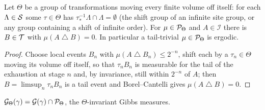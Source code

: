 \begin{proposition}[Georgii (14.9)]
    \label{prop:erg-149}
    \leanok

    Let $\Theta$ be a group of transformations moving every finite volume off itself: for each
    $\Lambda \in \mathcal{S}$ some $\tau \in \Theta$ has $\tau_*^{-1}\Lambda \cap \Lambda = \emptyset$
    (the shift group of an infinite site group, or any group containing a shift of infinite
    order). For $\mu \in \mathcal{P}_\Theta$ and $A \in \mathcal{I}$ there is $B \in \mathcal{T}$ with
    $\mu(A \mathbin{\triangle} B) = 0$. In particular a tail-trivial $\mu \in \mathcal{P}_\Theta$ is
    ergodic.
\end{proposition}
\begin{proof}
    \leanok

    Choose local events $B_n$ with $\mu(A \mathbin{\triangle} B_n) \le 2^{-n}$, shift each by a
    $\tau_n \in \Theta$ moving its volume off itself, so that $\tau_n B_n$ is measurable for the
    tail of the exhaustion at stage $n$ and, by invariance, still within $2^{-n}$ of $A$; then
    $B = \limsup_n \tau_n B_n$ is a tail event and Borel--Cantelli gives
    $\mu(A \mathbin{\triangle} B) = 0$.
\end{proof}

\begin{definition}[Georgii (14.14)]
    \label{def:erg-invariantG}
    \leanok

    $\mathcal{G}_\Theta(\gamma) = \mathcal{G}(\gamma) \cap \mathcal{P}_\Theta$, the $\Theta$-invariant
    Gibbs measures.
\end{definition}

